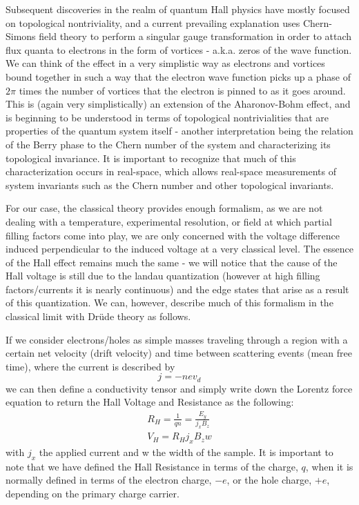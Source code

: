 \documentclass[reprint, nobibnotes, amssymb, amsmath, amsfonts, physics, mathtools, mathrsfs, floatfix]{revtex4-1}
\begin{document}
    Subsequent discoveries in the realm of quantum Hall physics have mostly focused on topological nontriviality, and a current prevailing explanation uses Chern-Simons field theory to perform a singular gauge transformation in order to attach flux quanta to electrons in the form of vortices - a.k.a. zeros of the wave function.  We can think of the effect in a very simplistic way as electrons and vortices bound together in such a way that the electron wave function picks up a phase of $2\pi$ times the number of vortices that the electron is pinned to as it goes around.  This is (again very simplistically) an extension of the Aharonov-Bohm effect, and is beginning to be understood in terms of topological nontrivialities that are properties of the quantum system itself - another interpretation being the relation of the Berry phase to the Chern number of the system and characterizing its topological invariance.  It is important to recognize that much of this characterization occurs in real-space, which allows real-space measurements of system invariants such as the Chern number and other topological invariants.

    For our case, the classical theory provides enough formalism, as we are not dealing with a temperature, experimental resolution, or field at which partial filling factors come into play, we are only concerned with the voltage difference induced perpendicular to the induced voltage at a very classical level.  The essence of the Hall effect remains much the same - we will notice that the cause of the Hall voltage is still due to the landau quantization (however at high filling factors/currents it is nearly continuous) and the edge states that arise as a result of this quantization.  We can, however, describe much of this formalism in the classical limit with Dr\"{u}de theory as follows.

    If we consider electrons/holes as simple masses traveling through a region with a certain net velocity (drift velocity) and time between scattering events (mean free time), where the current is described by
    \begin{equation}
      j = -nev_d
    \end{equation}
    we can then define a conductivity tensor and simply write down the Lorentz force equation to return the Hall Voltage and Resistance as the following:
    \begin{gather}
      R_H = \frac{1}{q n} = \frac{E_y}{j_x B_z} \label{hall_resist} \\
      V_H = R_H j_x B_z w \label{hall_volt}
    \end{gather}
    with $j_x$ the applied current and w the width of the sample.  It is important to note that we have defined the Hall Resistance in terms of the charge, $q$, when it is normally defined in terms of the electron charge, $-e$, or the hole charge, $+e$, depending on the primary charge carrier.
\end{document}
